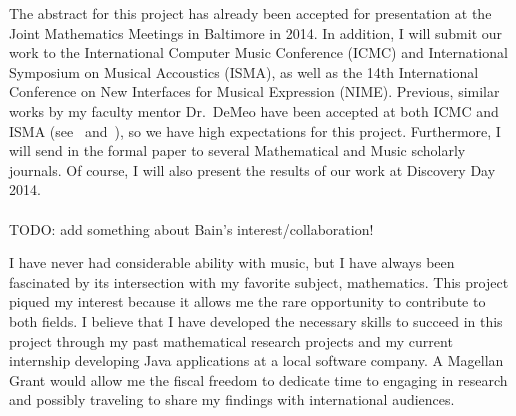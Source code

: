 \documentclass[10pt]{article}
\begin{document}
The abstract for this project has already been accepted for presentation at the
Joint Mathematics Meetings in Baltimore in 2014.  In addition, I will submit our
work to the International Computer Music Conference (ICMC) and International
Symposium on Musical Accoustics (ISMA), as well as the 14th International
Conference on New Interfaces for Musical Expression (NIME). Previous, similar
works by my faculty mentor Dr.~DeMeo have been accepted at both ICMC and ISMA
(see~\cite{nonabeliandsp} and~\cite{dissonance}), so we have high expectations
for this project. Furthermore, I will send in the formal paper to several
Mathematical and Music scholarly journals. Of course, I will also present the
results of our work at Discovery Day 2014.    \\
 \\
TODO: add something about Bain's interest/collaboration!

\vskip5mm

I have never had considerable ability with music, but I have always been
fascinated by its intersection with my favorite subject, mathematics.  This
project piqued my interest because it allows me the rare opportunity to
contribute to both fields.  I believe that I have developed the necessary skills
to succeed in this project through my past mathematical research projects and my
current internship developing Java applications at a local software company.  A
Magellan Grant would allow me the fiscal freedom to dedicate time to engaging in
research and possibly traveling to share my findings with international
audiences.  



\end{document}

